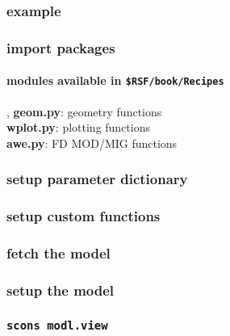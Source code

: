 \begin{frame} \frametitle{example}
  \vfill
\end{frame}
\cwpnote{}

\begin{frame} \frametitle{import packages}
  \framesubtitle{modules available in \texttt{\$RSF/book/Recipes} }
  \sep
  \alert{\textbf{geom.py}}: geometry functions \\
  \alert{\textbf{wplot.py}}: plotting functions \\
  \alert{\textbf{awe.py}}: FD MOD/MIG functions

\end{frame}
\cwpnote{}

\begin{frame} \frametitle{setup parameter dictionary}
\end{frame}
\cwpnote{}


\begin{frame} \frametitle{setup custom functions}
\end{frame}
\cwpnote{}

\begin{frame} \frametitle{fetch the model}
\end{frame}
\cwpnote{}

\begin{frame} \frametitle{setup the model}
\end{frame}
\cwpnote{}

\begin{frame} \frametitle{\texttt{scons modl.view}} 
\end{frame}

